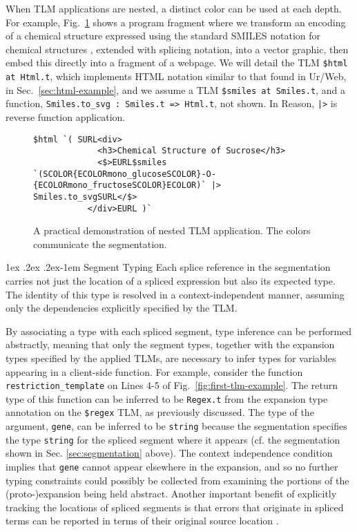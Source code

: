 \documentclass[acmsmall,screen]{acmart}
\makeatletter
\renewcommand{\subsubsection}{%
  \@startsection{subsubsection}{3}%
  {\z@}{1ex \@plus .2ex \@minus .2ex}{-1em}%
  {\sffamily\normalsize\itshape\maybe@addperiod}%
}
\newcommand{\maybe@addperiod}[1]{%
  #1\@addpunct{.}%
}
\newcommand{\li}[1]{\lstinline[basicstyle=\ttfamily\fontsize{9pt}{1em}\selectfont]{#1}}
\makeatother
\begin{document}
When TLM applications are nested, a distinct color can be used at each depth. For example, Fig.~\ref{fig:nesting-example} shows a program fragment where we transform an encoding of a chemical structure expressed using the standard SMILES notation for chemical structures \cite{anderson1987smiles}, extended with splicing notation, into a vector graphic, then embed this directly into a fragment of a webpage. We will detail the TLM \li{$html at Html.t}, which implements HTML notation similar to that found in Ur/Web, in Sec.~\ref{sec:html-example}, and we assume a TLM \li{$smiles at Smiles.t}, and a function, \li{Smiles.to_svg : Smiles.t => Html.t}, not shown. In Reason, \li{|>} is reverse function application.
\begin{figure}[t]
\vspace{-8px}
\begin{lstlisting}[numbers=none]
  $html `( SURL<div>
             <h3>Chemical Structure of Sucrose</h3>
             <$>EURL$smiles `(SCOLOR{ECOLORmono_glucoseSCOLOR}-O-{ECOLORmono_fructoseSCOLOR}ECOLOR)` |> Smiles.to_svgSURL</$>
           </div>EURL )`
\end{lstlisting}
\vspace{-2px}
\caption{A practical demonstration of nested TLM application. The colors communicate the segmentation.}
\label{fig:nesting-example}
\vspace{-4px}
\end{figure}

\subsubsection{Segment Typing}\label{sec:segment-typing} Each splice reference in the segmentation carries not just the location of a spliced expression but also its expected type. The identity of this type is resolved in a context-independent manner, assuming only the dependencies explicitly specified by the TLM.

By associating a type with each spliced segment, type inference can be performed abstractly, meaning that only the segment types, together with the expansion types specified by the applied TLMs, are necessary to infer types for variables appearing in a client-side function. For example, consider the function \li{restriction_template} on Lines 4-5 of Fig.~\ref{fig:first-tlm-example}. The return type of this function can be inferred to be \li{Regex.t} from the expansion type annotation on the \li{$regex} TLM, as previously discussed. The type of the argument, \li{gene}, can be inferred to be \li{string} because the segmentation specifies the type \li{string} for the spliced segment where it appears (cf. the segmentation shown in Sec. \ref{sec:segmentation} above). The context independence condition implies that \li{gene} cannot appear elsewhere in the expansion, and so no further typing constraints could possibly be collected from examining the portions of the (proto-)expansion being held abstract. Another important benefit of explicitly tracking the locations of spliced segments is that errors that originate in spliced terms can be reported in terms of their original source location \cite{DBLP:journals/jsc/DeursenKT93}.
\end{document}
